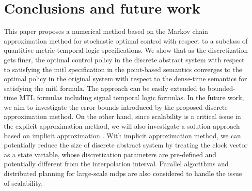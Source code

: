 \documentclass[letterpaper, 10 pt, conference]{ieeeconf}
\begin{document}
\section{Conclusions and future work}
\label{sec:conclude}
This paper proposes a numerical method based on the Markov chain
approximation method for stochastic optimal control with respect to a
subclass of quantitive metric temporal logic specifications. We show
that as the discretization gets finer, the optimal control policy in
the discrete abstract system with respect to satisfying the \ac{mitl}
specification in the point-based semantics converges to the optimal
policy in the original system with respect to the dense-time semantics
for satisfying the \ac{mitl} formula. The approach can be easily
extended to bounded-time MTL formulas including signal temporal logic
formulas. In the future work, we aim to investigate the error bounds
introduced by the proposed discrete approximation method. On the other
hand, since scalability is a critical issue in the explicit
approximation method, we will also investigate a solution approach
based on implicit approximation \cite{kushner2001numerical}. With
implicit approximation method, we can potentially reduce the size of
discrete abstract system by treating the clock vector as a state
variable, whose discretization parameters are pre-defined and
potentially different from the interpolation interval. Parallel
algorithms and distributed planning for large-scale \ac{mdp}s are also
considered to handle the issue of scalability.
\end{document}
